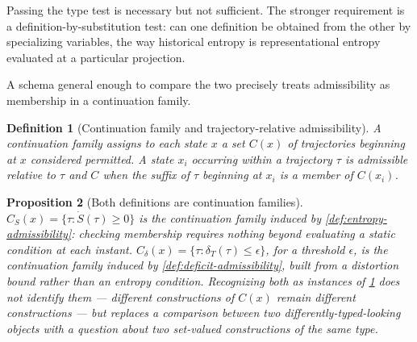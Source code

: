 \documentclass[12pt]{report}
\newtheorem{definition}{Definition}[section]
\newtheorem{proposition}[definition]{Proposition}
\begin{document}
Passing the type test is necessary but not sufficient. The stronger
requirement is a definition-by-substitution test: can one definition be
obtained from the other by specializing variables, the way historical
entropy is representational entropy evaluated at a particular
projection.

A schema general enough to compare the two precisely treats admissibility
as membership in a continuation family.

\begin{definition}[Continuation family and trajectory-relative admissibility]
\label{def:continuation-family}
A continuation family assigns to each state $x$ a set $C(x)$ of
trajectories beginning at $x$ considered permitted. A state $x_i$
occurring within a trajectory $\tau$ is admissible relative to $\tau$
and $C$ when the suffix of $\tau$ beginning at $x_i$ is a member of
$C(x_i)$.
\end{definition}

\begin{proposition}[Both definitions are continuation families]
\label{rem:schema-unification}
$C_S(x) = \{\tau : \dot{S}(\tau) \geq 0\}$ is the continuation family
induced by \cref{def:entropy-admissibility}: checking membership requires
nothing beyond evaluating a static condition at each instant.
$C_\delta(x) = \{\tau : \delta_T(\tau) \leq \epsilon\}$, for a threshold
$\epsilon$, is the continuation family induced by
\cref{def:deficit-admissibility}, built from a distortion bound rather
than an entropy condition. Recognizing both as instances of
\cref{def:continuation-family} does not identify them --- different
constructions of $C(x)$ remain different constructions --- but replaces
a comparison between two differently-typed-looking objects with a
question about two set-valued constructions of the same type.
\end{proposition}
\end{document}
